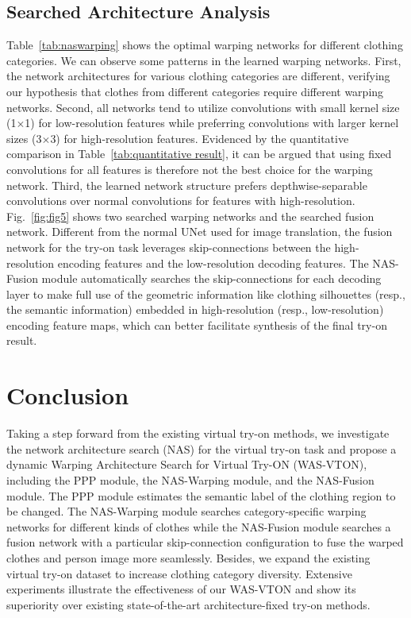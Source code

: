\documentclass[sigconf]{acmart}
\begin{document}
\subsection{Searched Architecture Analysis}
Table~\ref{tab:naswarping} shows the optimal warping networks for different clothing categories.
We can observe some patterns in the learned warping networks. First, the network architectures for various clothing categories are different, verifying our hypothesis that clothes from different categories require different warping networks. 
Second, all networks tend to utilize convolutions with small kernel size (1$\times$1) for low-resolution features while preferring convolutions with larger kernel sizes (3$\times$3) for high-resolution features.
Evidenced by the quantitative comparison in Table~\ref{tab:quantitative result}, it can be argued that using fixed convolutions for all features is therefore not the best choice for the warping network. Third, the learned network structure prefers depthwise-separable convolutions over normal convolutions for features with high-resolution. Fig.~\ref{fig:fig5} shows two searched warping networks and the searched fusion network. Different from the normal UNet used for image translation, the fusion network for the try-on task leverages skip-connections between the high-resolution encoding features and the low-resolution decoding features. The NAS-Fusion module automatically searches the skip-connections for each decoding layer to make full use of the geometric information like clothing silhouettes (resp., the semantic information) embedded in high-resolution (resp., low-resolution) encoding feature maps, which can better facilitate synthesis of the final try-on result.

\section{Conclusion}
Taking a step forward from the existing virtual try-on methods, we investigate the network architecture search (NAS) for the virtual try-on task and propose a dynamic Warping Architecture Search for Virtual Try-ON (WAS-VTON), including the PPP module, the NAS-Warping module, and the NAS-Fusion module. The PPP module estimates the semantic label of the clothing region to be changed. The NAS-Warping module searches category-specific warping networks for different kinds of clothes while the NAS-Fusion module searches a fusion network with a particular skip-connection configuration to fuse the warped clothes and person image more seamlessly. Besides, we expand the existing virtual try-on dataset to increase clothing category diversity. Extensive experiments illustrate the effectiveness of our WAS-VTON and show its superiority over existing state-of-the-art architecture-fixed try-on methods.
\end{document}
